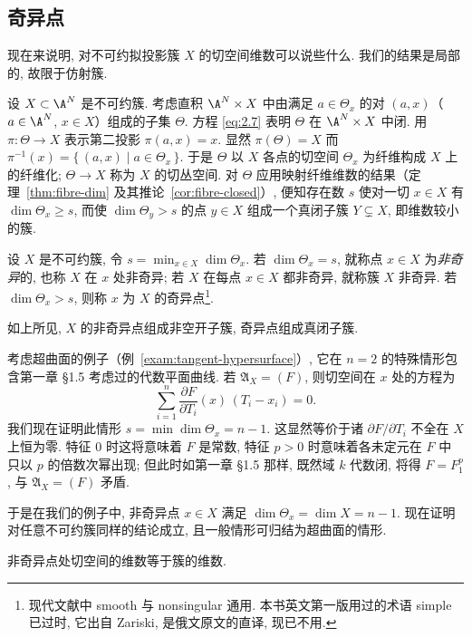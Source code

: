 \subsection{奇异点}

现在来说明, 对不可约拟投影簇 $X$ 的切空间维数可以说些什么. 我们的结果是局部的, 故限于仿射簇.

设 $X \subset \A^N$ 是不可约簇. 考虑直积 $\A^N \times X$ 中由满足 $a \in \Theta_x$ 的对 $(a, x)$（$a \in \A^N$, $x \in X$）组成的子集 $\Theta$. 方程 \eqref{eq:2.7} 表明 $\Theta$ 在 $\A^N \times X$ 中闭. 用 $\pi: \Theta \to X$ 表示第二投影 $\pi(a, x) = x$. 显然 $\pi(\Theta) = X$ 而 $\pi^{-1}(x) = \{\, (a, x) \mid a \in \Theta_x \,\}$. 于是 $\Theta$ 以 $X$ 各点的切空间 $\Theta_x$ 为纤维构成 $X$ 上的纤维化; $\Theta \to X$ 称为 $X$ 的切丛空间. 对 $\Theta$ 应用映射纤维维数的结果（定理~\ref{thm:fibre-dim} 及其推论~\ref{cor:fibre-closed}）, 便知存在数 $s$ 使对一切 $x \in X$ 有 $\dim \Theta_x \ge s$, 而使 $\dim \Theta_y > s$ 的点 $y \in X$ 组成一个真闭子簇 $Y \subsetneq X$, 即维数较小的簇.

\begin{definition}[非奇异点]\label{def:nonsingular-point}
	设 $X$ 是不可约簇, 令 $s = \min_{x \in X} \dim \Theta_x$. 若 $\dim \Theta_x = s$, 就称点 $x \in X$ 为\emph{非奇异}的, 也称 $X$ 在 $x$ 处非奇异; 若 $X$ 在每点 $x \in X$ 都非奇异, 就称簇 $X$ 非奇异. 若 $\dim \Theta_x > s$, 则称 $x$ 为 $X$ 的奇异点\footnote{现代文献中 smooth 与 nonsingular 通用. 本书英文第一版用过的术语 simple 已过时, 它出自 Zariski, 是俄文原文的直译, 现已不用.}.
\end{definition}

如上所见, $X$ 的非奇异点组成非空开子簇, 奇异点组成真闭子簇.

考虑超曲面的例子（例~\ref{exam:tangent-hypersurface}）, 它在 $n = 2$ 的特殊情形包含第一章 §1.5 考虑过的代数平面曲线. 若 $\mathfrak A_X = (F)$, 则切空间在 $x$ 处的方程为
\[
	\sum_{i=1}^{n} \frac{\partial F}{\partial T_i}(x)\, (T_i - x_i) = 0.
\]
我们现在证明此情形 $s = \min \dim \Theta_x = n-1$. 这显然等价于诸 $\partial F/\partial T_i$ 不全在 $X$ 上恒为零. 特征 $0$ 时这将意味着 $F$ 是常数, 特征 $p > 0$ 时意味着各未定元在 $F$ 中只以 $p$ 的倍数次幂出现; 但此时如第一章 §1.5 那样, 既然域 $k$ 代数闭, 将得 $F = F_1^p$, 与 $\mathfrak A_X = (F)$ 矛盾.

于是在我们的例子中, 非奇异点 $x \in X$ 满足 $\dim \Theta_x = \dim X = n-1$. 现在证明对任意不可约簇同样的结论成立, 且一般情形可归结为超曲面的情形.

\begin{theorem}\label{thm:nonsingular-dim}
	非奇异点处切空间的维数等于簇的维数.
\end{theorem}

